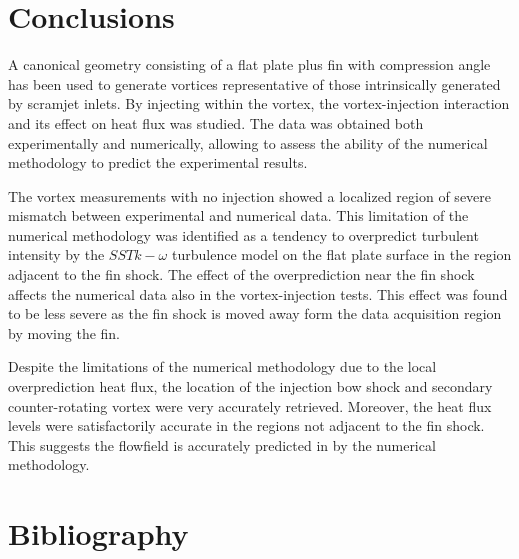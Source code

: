\documentclass{AIAA}
\begin{document}
\section{Conclusions}

A canonical geometry consisting of a flat plate plus fin with compression angle has been used to generate vortices representative of those intrinsically generated by scramjet inlets. By injecting within the vortex, the vortex-injection interaction and its effect on heat flux was studied. The data was obtained both experimentally and numerically, allowing to assess the ability of the numerical methodology to predict the experimental results.

The vortex measurements with no injection showed a localized region of severe mismatch between experimental and numerical data. This limitation of the numerical methodology was identified as a tendency to overpredict turbulent intensity by the $SST k-\omega$ turbulence model on the flat plate surface in the region adjacent to the fin shock. The effect of the overprediction near the fin shock affects the numerical data also in the vortex-injection tests. This effect was found to be less severe as the fin shock is moved away form the data acquisition region by moving the fin.

Despite the limitations of the numerical methodology due to the local overprediction heat flux, the location of the injection bow shock and secondary counter-rotating vortex were very accurately retrieved. Moreover, the heat flux levels were satisfactorily accurate in the regions not adjacent to the fin shock. This suggests the flowfield is accurately predicted in by the numerical methodology.


\section{Bibliography}
\end{document}
